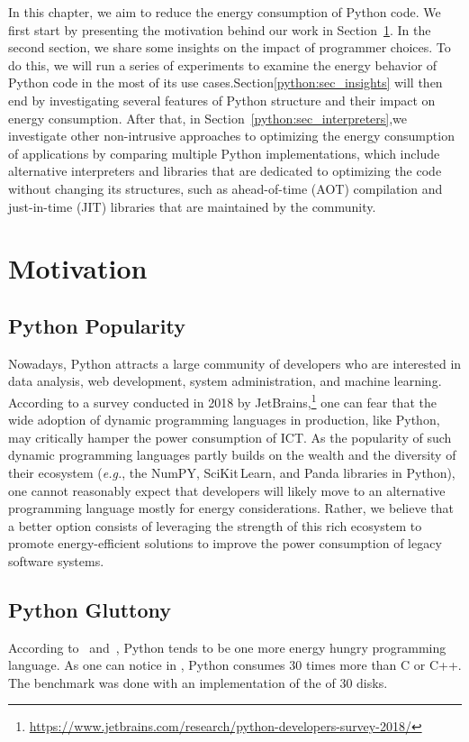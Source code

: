 In this chapter, we aim to reduce the energy consumption of Python code.
We first start by presenting the motivation behind our work in Section~\ref{python:sec_motivation}.
In the second section, we share some insights on the impact of programmer choices. To do this, we will run a series of experiments to examine the energy behavior of Python code in the most of its use cases.Section\ref{python:sec_insights} will then end by investigating several features of Python structure and their impact on energy consumption.
After that, in Section~\ref{python:sec_interpreters},we investigate other non-intrusive approaches to optimizing the energy consumption of applications by comparing multiple Python implementations, which include alternative interpreters and libraries that are dedicated to optimizing the code without changing its structures, such as ahead-of-time (AOT) compilation and just-in-time (JIT) libraries that are maintained by the community.


\section{Motivation}\label{python:sec_motivation}

\subsection{Python Popularity}
Nowadays, Python attracts a large community of developers who are interested in data analysis, web development, system administration, and machine learning.
According to a survey conducted in 2018 by JetBrains,\footnote{\url{https://www.jetbrains.com/research/python-developers-survey-2018/}} one can fear that the wide adoption of dynamic programming languages in production, like Python, may critically hamper the power consumption of ICT.
As the popularity of such dynamic programming languages partly builds on the wealth and the diversity of their ecosystem (\emph{e.g.}, the NumPY, SciKit\,Learn, and Panda libraries in Python), one cannot reasonably expect that developers will likely move to an alternative programming language mostly for energy considerations.
Rather, we believe that a better option consists of leveraging the strength of this rich ecosystem to promote energy-efficient solutions to improve the power consumption of legacy software systems.

\subsection{Python Gluttony}
According to~\cite{pinto_energy_2017} and~\cite{noureddine_preliminary_2012}, Python tends to be one more energy hungry programming language.
As one can notice in , Python consumes $30$ times more than C or C++.
The benchmark was done with an implementation of the  of 30 disks.

